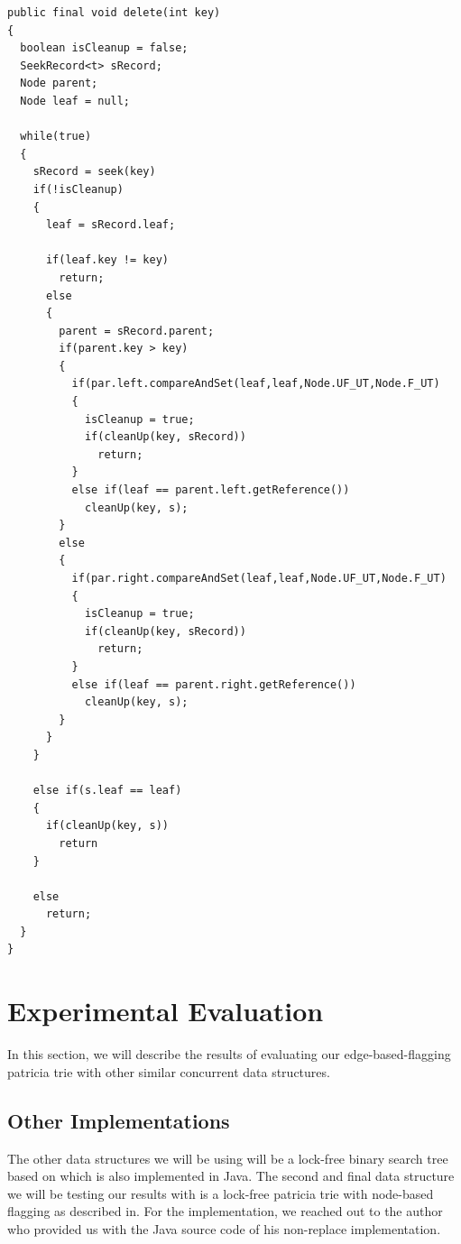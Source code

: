 \documentclass[conference]{IEEEtran}
\begin{document}
\begin{lstlisting}[frame=lines]
public final void delete(int key)
{
  boolean isCleanup = false;
  SeekRecord<t> sRecord;
  Node parent;
  Node leaf = null;

  while(true)
  {
    sRecord = seek(key)
    if(!isCleanup)
    {
      leaf = sRecord.leaf;

      if(leaf.key != key)
        return;
      else
      {
        parent = sRecord.parent;
        if(parent.key > key)
        {
          if(par.left.compareAndSet(leaf,leaf,Node.UF_UT,Node.F_UT)
          {
            isCleanup = true;
            if(cleanUp(key, sRecord))
              return;
          }
          else if(leaf == parent.left.getReference())
            cleanUp(key, s);
        }
        else
        {
          if(par.right.compareAndSet(leaf,leaf,Node.UF_UT,Node.F_UT)
          {
            isCleanup = true;
            if(cleanUp(key, sRecord))
              return;
          }
          else if(leaf == parent.right.getReference())
            cleanUp(key, s);
        }
      }
    }

    else if(s.leaf == leaf)
    {
      if(cleanUp(key, s))
        return
    }

    else
      return;
  }
}
\end{lstlisting}

\section{Experimental Evaluation}
In this section, we will describe the results of evaluating our edge-based-flagging patricia trie with other similar concurrent data structures.

\subsection{Other Implementations}
The other data structures we will be using will be a lock-free binary search tree based on\cite{Natarajan2014} which is also implemented in Java\cite{LFBST}. The second and final data structure we will be testing our results with is a lock-free patricia trie with node-based flagging as described in\cite{Shafiei2013}. For the implementation, we reached out to the author who provided us with the Java source code of his non-replace implementation.
\end{document}
